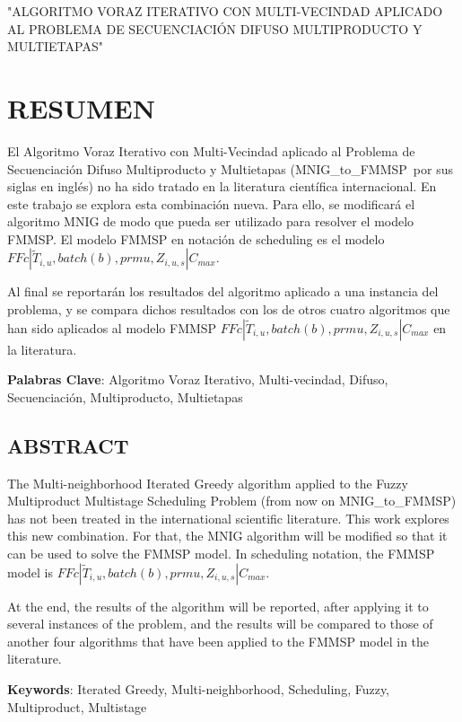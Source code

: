 \documentclass{article}
\def\algmod{MNIG\_to\_FMMSP} %
\def\notac_modelo{$FFc | \tilde{T}_{i, u}, batch(b), prmu, Z_{i, u, s} | C_{max}$}
\begin{document}
"ALGORITMO VORAZ ITERATIVO CON MULTI-VECINDAD APLICADO AL PROBLEMA DE SECUENCIACIÓN DIFUSO MULTIPRODUCTO Y \linebreak MULTIETAPAS"

\newpage

\section{RESUMEN}

El Algoritmo Voraz Iterativo con Multi-Vecindad aplicado al Problema de Secuenciación Difuso Multiproducto y Multietapas (\algmod\ por sus siglas en inglés) no ha sido tratado en la literatura científica internacional. En este trabajo se explora esta combinación nueva. Para ello, se modificará el algoritmo MNIG de modo que pueda ser utilizado para resolver el modelo FMMSP. El modelo FMMSP en notación de scheduling es el modelo \linebreak \notac_modelo.

\vspace{\baselineskip}
Al final se reportarán los resultados del algoritmo aplicado a una instancia del problema, y se compara dichos resultados con los de otros cuatro algoritmos que han sido aplicados al modelo FMMSP \notac_modelo en la literatura.

\vspace{\baselineskip}
\textbf{Palabras Clave}: Algoritmo Voraz Iterativo, Multi-vecindad, Difuso, Secuenciación, Multiproducto, Multietapas

\subsection{ABSTRACT}

The Multi-neighborhood Iterated Greedy algorithm applied to the Fuzzy Multiproduct Multistage Scheduling Problem (from now on \algmod) has not been treated in the international scientific literature. This work explores this new combination. For that, the MNIG algorithm will be modified so that it can be used to solve the FMMSP model. In scheduling notation, the FMMSP model is \notac_modelo.

\vspace{\baselineskip}
At the end, the results of the algorithm will be reported, after applying it to several instances of the problem, and the results will be compared to those of another four algorithms that have been applied to the FMMSP model in the literature. 

\vspace{\baselineskip}
\par \textbf{Keywords}: Iterated Greedy, Multi-neighborhood, Scheduling, Fuzzy, Multiproduct, Multistage
\end{document}
